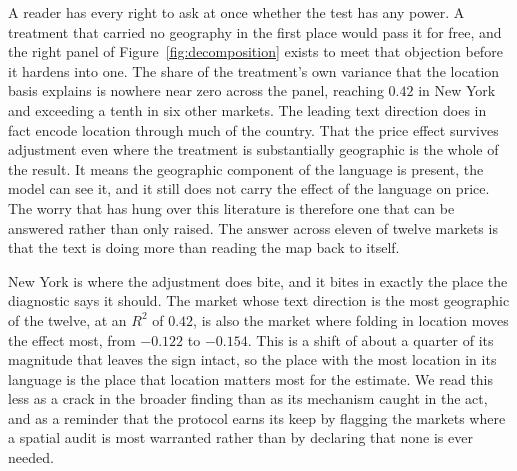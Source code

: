 A reader has every right to ask at once whether the test has any power. A
treatment that carried no geography in the first place would pass it for
free, and the right panel of Figure~\ref{fig:decomposition} exists to meet that
objection before it hardens into one. The share of the treatment's own variance
that the location basis explains is nowhere near zero across the panel, reaching
$0.42$ in New York and exceeding a tenth in six other markets. The leading text
direction does in fact encode location through much of the country. That the price
effect survives adjustment even where the treatment is substantially geographic is
the whole of the result. It means the geographic component of the language
is present, the model can see it, and it still does not carry the effect of the
language on price. The worry that has hung over this literature is therefore one
that can be answered rather than only raised. The answer across eleven of
twelve markets is that the text is doing more than reading the map back to itself.

New York is where the adjustment does bite, and it bites in exactly the place
the diagnostic says it should. The market whose text direction is the most
geographic of the twelve, at an $R^2$ of $0.42$, is also the market where folding
in location moves the effect most, from $-0.122$ to $-0.154$. This is a shift of about a
quarter of its magnitude that leaves the sign intact, so the place with the
most location in its language is the place that location matters most for the
estimate. We read this less as a crack in the broader finding than as its
mechanism caught in the act, and as a reminder that the protocol earns its keep by
flagging the markets where a spatial audit is most warranted rather than by
declaring that none is ever needed.

